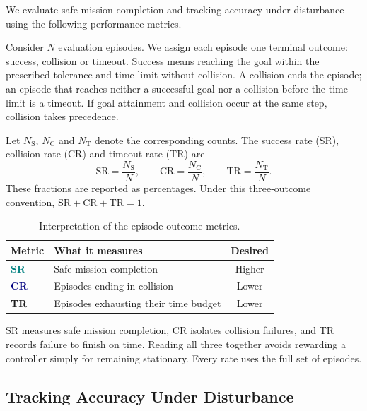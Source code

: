 We evaluate safe mission completion and tracking accuracy under disturbance using the following performance metrics.

Consider $N$ evaluation episodes. We assign each episode one terminal outcome: success, collision or timeout. Success means reaching the goal within the prescribed tolerance and time limit without collision. A collision ends the episode; an episode that reaches neither a successful goal nor a collision before the time limit is a timeout. If goal attainment and collision occur at the same step, collision takes precedence.

Let $N_{\mathrm{S}}$, $N_{\mathrm{C}}$ and $N_{\mathrm{T}}$ denote the corresponding counts. The success rate (SR), collision rate (CR) and timeout rate (TR) are
\begin{equation}
 \mathrm{SR}=\frac{N_{\mathrm{S}}}{N},\qquad
 \mathrm{CR}=\frac{N_{\mathrm{C}}}{N},\qquad
 \mathrm{TR}=\frac{N_{\mathrm{T}}}{N}.
 \label{eq:episode_rates}
\end{equation}
These fractions are reported as percentages. Under this three-outcome convention, $\mathrm{SR}+\mathrm{CR}+\mathrm{TR}=1$.

\begin{table}[H]
\centering
\caption{Interpretation of the episode-outcome metrics.}
\label{tab:episode_metrics}
\renewcommand{\arraystretch}{1.35}
\begin{tabularx}{\linewidth}{@{}lYc@{}}
\toprule
\textbf{Metric} & \textbf{What it measures} & \textbf{Desired}\\
\midrule
\textcolor{teal}{\textbf{SR}} & Safe mission completion & Higher\\
\textcolor{navy}{\textbf{CR}} & Episodes ending in collision & Lower\\
\textbf{TR} & Episodes exhausting their time budget & Lower\\
\bottomrule
\end{tabularx}
\end{table}

SR measures safe mission completion, CR isolates collision failures, and TR records failure to finish on time. Reading all three together avoids rewarding a controller simply for remaining stationary. Every rate uses the full set of episodes.

\clearpage
\subsection{Tracking Accuracy Under Disturbance}
\label{sec:tracking_accuracy}

